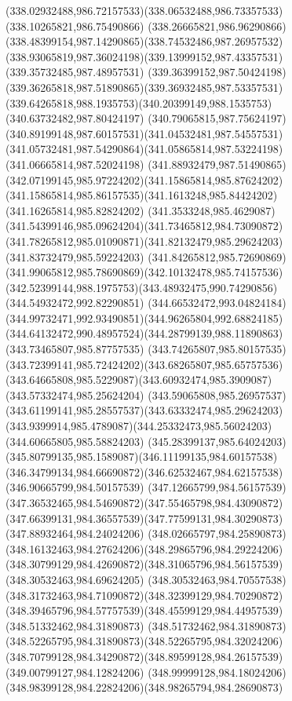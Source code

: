 {{\curveto(338.02932488,986.72157533)(338.06532488,986.73357533)(338.10265821,986.75490866)
\curveto(338.26665821,986.96290866)(338.48399154,987.14290865)(338.74532486,987.26957532)
\curveto(338.93065819,987.36024198)(339.13999152,987.43357531)(339.35732485,987.48957531)
\curveto(339.36399152,987.50424198)(339.36265818,987.51890865)(339.36932485,987.53357531)
\curveto(339.64265818,988.1935753)(340.20399149,988.1535753)(340.63732482,987.80424197)
\curveto(340.79065815,987.75624197)(340.89199148,987.60157531)(341.04532481,987.54557531)
\curveto(341.05732481,987.54290864)(341.05865814,987.53224198)(341.06665814,987.52024198)
\curveto(341.88932479,987.51490865)(342.07199145,985.97224202)(341.15865814,985.87624202)
\curveto(341.15865814,985.86157535)(341.1613248,985.84424202)(341.16265814,985.82824202)
\curveto(341.3533248,985.4629087)(341.54399146,985.09624204)(341.73465812,984.73090872)
\curveto(341.78265812,985.01090871)(341.82132479,985.29624203)(341.83732479,985.59224203)
\curveto(341.84265812,985.72690869)(341.99065812,985.78690869)(342.10132478,985.74157536)
\curveto(342.52399144,988.1975753)(343.48932475,990.74290856)(344.54932472,992.82290851)
\curveto(344.66532472,993.04824184)(344.99732471,992.93490851)(344.96265804,992.68824185)
\curveto(344.64132472,990.48957524)(344.28799139,988.11890863)(343.73465807,985.87757535)
\curveto(343.74265807,985.80157535)(343.72399141,985.72424202)(343.68265807,985.65757536)
\curveto(343.64665808,985.5229087)(343.60932474,985.3909087)(343.57332474,985.25624204)
\curveto(343.59065808,985.26957537)(343.61199141,985.28557537)(343.63332474,985.29624203)
\curveto(343.9399914,985.4789087)(344.25332473,985.56024203)(344.60665805,985.58824203)
\curveto(345.28399137,985.64024203)(345.80799135,985.1589087)(346.11199135,984.60157538)
\curveto(346.34799134,984.66690872)(346.62532467,984.62157538)(346.90665799,984.50157539)
\curveto(347.12665799,984.56157539)(347.36532465,984.54690872)(347.55465798,984.43090872)
\curveto(347.66399131,984.36557539)(347.77599131,984.30290873)(347.88932464,984.24024206)
\curveto(348.02665797,984.25890873)(348.16132463,984.27624206)(348.29865796,984.29224206)
\curveto(348.30799129,984.42690872)(348.31065796,984.56157539)(348.30532463,984.69624205)
\curveto(348.30532463,984.70557538)(348.31732463,984.71090872)(348.32399129,984.70290872)
\curveto(348.39465796,984.57757539)(348.45599129,984.44957539)(348.51332462,984.31890873)
\curveto(348.51732462,984.31890873)(348.52265795,984.31890873)(348.52265795,984.32024206)
\curveto(348.70799128,984.34290872)(348.89599128,984.26157539)(349.00799127,984.12824206)
\curveto(348.99999128,984.18024206)(348.98399128,984.22824206)(348.98265794,984.28690873)
}}
